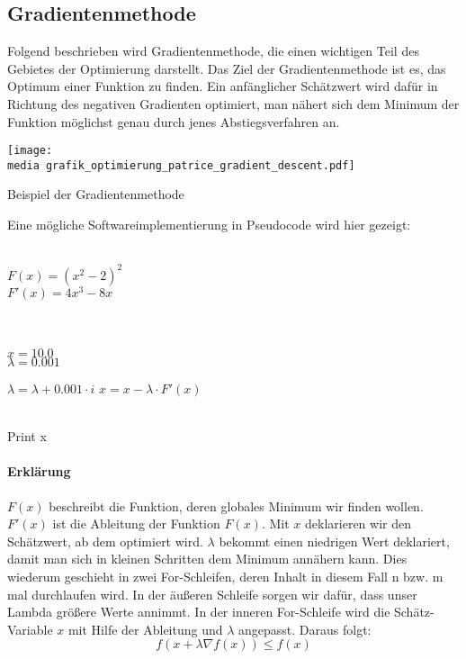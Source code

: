 \subsection{Gradientenmethode}

Folgend beschrieben wird Gradientenmethode, die einen wichtigen Teil des Gebietes der Optimierung darstellt.
Das Ziel der Gradientenmethode ist es, das Optimum einer Funktion zu finden. Ein 
anfänglicher Schätzwert wird dafür in Richtung des negativen Gradienten 
optimiert, man nähert sich dem Minimum der Funktion möglichst genau durch jenes 
Abstiegsverfahren an.

\begin{dsafigure}
\begin{center}
\texttt{[image: \\media grafik\_optimierung\_patrice\_gradient\_descent.pdf]}
\label{figure:grafik_optimierung_patrice_gradient_descent}
\caption{Beispiel der Gradientenmethode}
\end{center}
\end{dsafigure}

Eine mögliche Softwareimplementierung in Pseudocode wird hier gezeigt:

\begin{algorithmic}[1]

   \\$F(x) = (x^2-2)^2$
\\$F'(x) = 4x^3-8x$

\\
\\$x = 10.0$
\\$\lambda = 0.001$

 \State $\lambda = \lambda+0.001\cdot i$
    \State $x = x - \lambda \cdot F'(x)$
  \EndFor
\EndFor
 
 
\\Print x\EndProcedure
\Statex
\end{algorithmic}

\paragraph{Erklärung}
$F(x)$ beschreibt die Funktion, deren globales Minimum wir finden wollen. $F'(x)$ ist die Ableitung der Funktion $F(x)$. Mit $x$ deklarieren wir den Schätzwert, ab dem optimiert wird. $\lambda$ bekommt einen niedrigen Wert deklariert, damit man sich in kleinen Schritten dem Minimum annähern kann. Dies wiederum geschieht in zwei For-Schleifen, deren Inhalt in diesem Fall n bzw. m mal durchlaufen wird. In der äußeren Schleife sorgen wir dafür, dass unser Lambda größere Werte annimmt. In der inneren For-Schleife wird die Schätz-Variable $x$ mit Hilfe der Ableitung und $\lambda$ angepasst. Daraus folgt:
\begin{equation*}
 f(x+\lambda \nabla f(x)) \leq f(x)
 \end{equation*}

